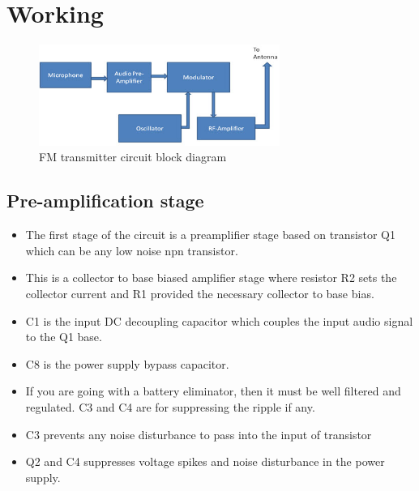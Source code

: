 \chapter{Working}
 
 	\begin{figure}[ht]
 	\centering
	 	\includegraphics[width=0.70\textwidth]{blockdiag.jpg}
 	\caption{FM transmitter circuit block diagram}
 	\label{fig:block}
 \end{figure}
 \section{Pre-amplification stage}
	\begin{itemize}
		
	\item The first stage of the circuit is a preamplifier stage based on transistor Q1 which can be any low noise npn transistor. 
	\item This is a collector to base biased amplifier stage where resistor R2 sets the collector current and R1 provided the necessary collector to base bias.
	\item C1 is the input DC decoupling capacitor which couples the input audio signal to the Q1 base.
	\item C8 is the power supply bypass capacitor.
	\item If you are going with a battery eliminator, then it must be well filtered and regulated. C3 and C4 are for suppressing the ripple if any.
	\item C3 prevents any noise disturbance to pass into the input of transistor \item Q2 and C4 suppresses voltage spikes and noise disturbance in the power supply.	
	\end{itemize} 		
%
